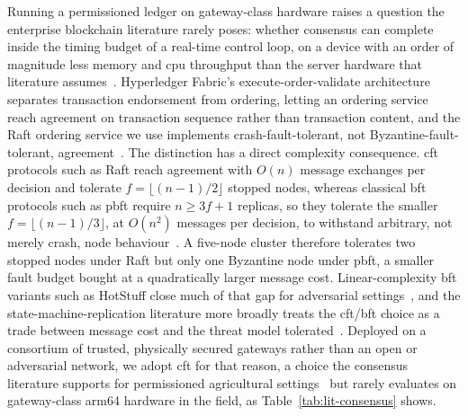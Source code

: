 \documentclass[12pt,a4paper,oneside]{book}
\begin{document}
Running a permissioned ledger on gateway-class hardware raises a question
the enterprise blockchain literature rarely poses: whether consensus can
complete inside the timing budget of a real-time control loop, on a device
with an order of magnitude less memory and \gls{cpu} throughput than the
server hardware that literature assumes~\cite{tar2023fabric, jayaram2023hyperledger, ibmFabric}. Hyperledger Fabric's execute-order-validate
architecture separates transaction endorsement from ordering, letting an
ordering service reach agreement on transaction sequence rather than
transaction content, and the Raft ordering service we use
implements crash-fault-tolerant, not Byzantine-fault-tolerant,
agreement~\cite{ongaro2014raft, orderingServiceDoc}. The distinction has a
direct complexity consequence. \gls{cft} protocols such as Raft reach
agreement with $O(n)$ message exchanges per decision and tolerate
$f = \lfloor (n-1)/2 \rfloor$ stopped nodes, whereas classical
\gls{bft} protocols such as \gls{pbft} require $n \geq 3f+1$ replicas,
so they tolerate the smaller
$f = \lfloor (n-1)/3 \rfloor$, at $O(n^2)$ messages per decision, to
withstand arbitrary, not merely crash, node
behaviour~\cite{castro1999practical, ongaro2014raft}. A five-node
cluster therefore tolerates two stopped nodes under Raft but only one
Byzantine node under \gls{pbft}, a smaller fault budget bought at a
quadratically larger message cost. Linear-complexity \gls{bft} variants
such as HotStuff
close much of that gap for adversarial settings~\cite{yin2019hotstuff}, and
the state-machine-replication literature more broadly treats the
\gls{cft}/\gls{bft} choice as a trade between message cost and the
threat model tolerated~\cite{bessani2014state}. Deployed on a
consortium of trusted, physically secured gateways rather than an open or
adversarial network, we adopt \gls{cft} for that reason, a choice the
consensus literature supports for permissioned agricultural
settings~\cite{dube2024fabricIrrigation} but rarely evaluates on
gateway-class \gls{arm64} hardware in the field, as
Table~\ref{tab:lit-consensus} shows.
\end{document}
